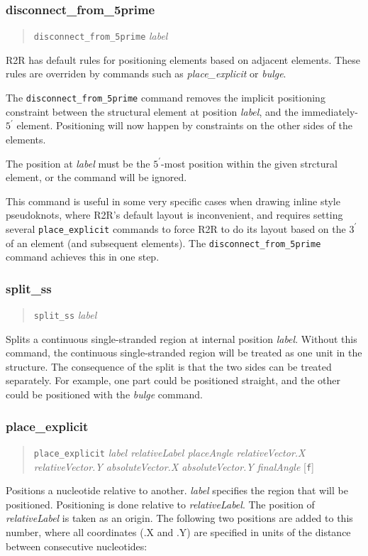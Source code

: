 \documentclass[letterpaper,12pt]{report}
\newcommand{\example}[1]{
\begin{quote}
{\raggedright
#1
}
\end{quote}
}
\begin{document}
\subsubsection{disconnect\_from\_5prime}
\example{{\tt disconnect\_from\_5prime} \textit{label}}

R2R has default rules for positioning elements based on adjacent elements.
These rules are overriden by commands such as {\it place\_explicit} or
{\it bulge}.

The {\tt disconnect\_from\_5prime} command removes the implicit
positioning constraint between the structural element
at position \textit{label}, and the immediately-$5^\prime$ element.
Positioning will now happen by constraints on the other sides of the elements.

The position at \textit{label} must be the $5^\prime$-most position within the given strctural element, or the command will be ignored.

This command is useful in some very specific cases when drawing inline
style pseudoknots, where R2R's default layout is inconvenient, and requires
setting several {\tt place\_explicit} commands to force R2R to do its layout
based on the $3^\prime$ of an element (and subsequent elements).
The {\tt disconnect\_from\_5prime} command achieves this in one step.

\subsubsection{split\_ss}
\example{{\tt split\_ss} \textit{label}
}

Splits a continuous single-stranded region at internal position \textit{label}.  Without this command, the continuous single-stranded region will be treated as one unit in the structure.  The consequence of the split is that the two sides can be treated separately.  For example, one part could be positioned straight, and the other could be positioned with the {\it bulge} command.

\subsubsection{place\_explicit}
\label{sec:placeexplicit}
\example{{\tt place\_explicit} \textit{label  relativeLabel  placeAngle 
relativeVector.X relativeVector.Y  absoluteVector.X absoluteVector.Y 
finalAngle }[{\tt f}]
}

Positions a nucleotide relative to another.  \textit{label} specifies
the region that will be positioned.  Positioning is done relative to
\textit{relativeLabel}.  The position of \textit{relativeLabel} is
taken as an origin.  The following two positions are added to this
number, where all coordinates (.X and .Y) are specified in units of the
distance between consecutive nucleotides:
\end{document}
